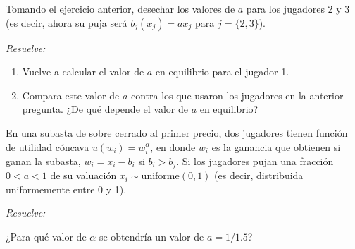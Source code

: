 \documentclass[12pt]{scrartcl} %
\begin{document}
\begin{Exercise}[name=Pregunta]

Tomando el ejercicio anterior, desechar los valores de $ a $ para los jugadores 2 y 3 (es decir, ahora su puja será $ b_j(x_j)=ax_j $ para $ j=\{2, 3\} $).  

\textit{Resuelve:}

\begin{enumerate}
\setlength{\itemsep}{0pt}
\setlength{\parskip}{0pt}
\setlength{\parsep}{0pt}
  \item Vuelve a calcular el valor de $ a $ en equilibrio para el jugador 1.
  \item Compara este valor de $ a $ contra los que usaron los jugadores en la anterior pregunta. ¿De qué depende el valor de $ a $ en equilibrio?
\end{enumerate}
  
\end{Exercise}

\begin{Exercise}[name=Pregunta]

  En una subasta de sobre cerrado al primer precio, dos jugadores tienen función de utilidad cóncava $ u(w_i)=w_i^\alpha $, en donde $ w_i $ es la ganancia que obtienen si ganan la subasta, $ w_i = x_i - b_i $ si $ b_i > b_j $. Si los jugadores pujan una fracción $0 < a < 1$ de su valuación $ x_i \sim \text{uniforme} (0, 1) $ (es decir, distribuida uniformemente entre 0 y 1).

  \textit{Resuelve:}

  ¿Para qué valor de $ \alpha $ se obtendría un valor de $ a = 1/1.5 $?
  
\end{Exercise}
\end{document}
